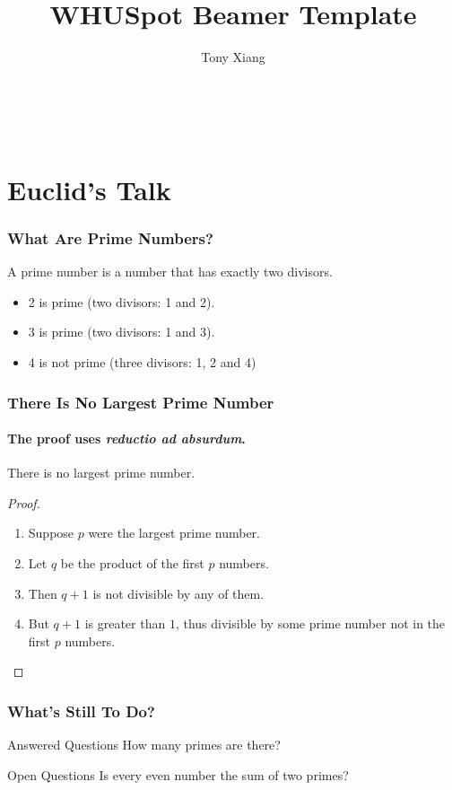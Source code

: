 \documentclass{beamer}
\title{WHUSpot Beamer Template}
\author{Tony Xiang}
\institute{Wuhan University}
\begin{document}
\begin{frame}
	\frametitle{\\}
	\titlepage
\end{frame}

\section{Euclid's Talk}
\begin{frame}
    \frametitle{What Are Prime Numbers?}
    \begin{definition}
        A \alert{prime number} is a number that has exactly two divisors.
    \end{definition}
    \begin{itemize}
        \item 2 is prime (two divisors: 1 and 2).
        \pause
        \item 3 is prime (two divisors: 1 and 3).
        \pause
        \item 4 is not prime (\alert{three} divisors: 1, 2 and 4) 
    \end{itemize}
\end{frame}

\begin{frame} %
    \frametitle{There Is No Largest Prime Number}
    \framesubtitle{The proof uses \textit{reductio ad absurdum}.}
    \begin{theorem}
        There is no largest prime number.
    \end{theorem}
    \begin{proof}
        \begin{enumerate}
            \item<1-> Suppose $p$ were the largest prime number.
            \item<2-> Let $q$ be the product of the first $p$ numbers.
            \item<3-> Then $q + 1$ is not divisible by any of them.
            \item<1-> But $q + 1$ is greater than $1$, thus divisible by some prime number not in the first $p$ numbers. \qedhere
        \end{enumerate}
    \end{proof}
\end{frame}

\begin{frame}
    \frametitle{What's Still To Do?}
    \begin{block}{Answered Questions}
        How many primes are there?
    \end{block}
    \begin{block}{Open Questions}
        Is every even number the sum of two primes?
    \end{block}
\end{frame}
\end{document}
